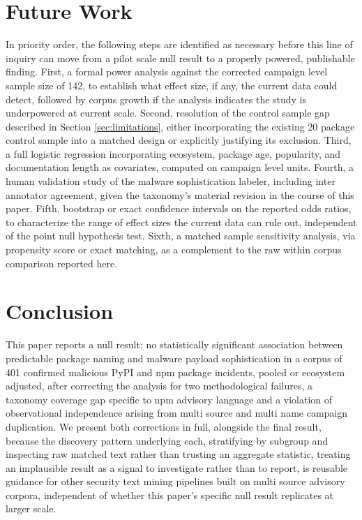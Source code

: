 \documentclass[journal]{IEEEtran}
\begin{document}
\section{Future Work}
\label{sec:future}

In priority order, the following steps are identified as necessary before this line of inquiry can move from a pilot scale null result to a properly powered, publishable finding. First, a formal power analysis against the corrected campaign level sample size of 142, to establish what effect size, if any, the current data could detect, followed by corpus growth if the analysis indicates the study is underpowered at current scale. Second, resolution of the control sample gap described in Section \ref{sec:limitations}, either incorporating the existing 20 package control sample into a matched design or explicitly justifying its exclusion. Third, a full logistic regression incorporating ecosystem, package age, popularity, and documentation length as covariates, computed on campaign level units. Fourth, a human validation study of the malware sophistication labeler, including inter annotator agreement, given the taxonomy's material revision in the course of this paper. Fifth, bootstrap or exact confidence intervals on the reported odds ratios, to characterize the range of effect sizes the current data can rule out, independent of the point null hypothesis test. Sixth, a matched sample sensitivity analysis, via propensity score or exact matching, as a complement to the raw within corpus comparison reported here.

\section{Conclusion}
\label{sec:conclusion}

This paper reports a null result: no statistically significant association between predictable package naming and malware payload sophistication in a corpus of 401 confirmed malicious PyPI and npm package incidents, pooled or ecosystem adjusted, after correcting the analysis for two methodological failures, a taxonomy coverage gap specific to npm advisory language and a violation of observational independence arising from multi source and multi name campaign duplication. We present both corrections in full, alongside the final result, because the discovery pattern underlying each, stratifying by subgroup and inspecting raw matched text rather than trusting an aggregate statistic, treating an implausible result as a signal to investigate rather than to report, is reusable guidance for other security text mining pipelines built on multi source advisory corpora, independent of whether this paper's specific null result replicates at larger scale.
\end{document}
